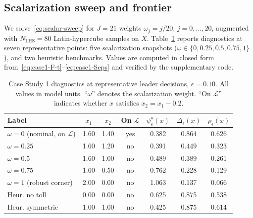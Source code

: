 \documentclass[11pt]{article}
\theoremstyle{definition}
\newcommand{\eps}{\epsilon}
\begin{document}
\subsection{Scalarization sweep and frontier}
We solve~\eqref{eq:scalar-sweep} for $J=21$ weights
$\omega_j=j/20$, $j=0,\dots,20$, augmented with
$N_\mathrm{LHS}=80$ Latin-hypercube samples on $X$.
Table~\ref{tab:case1-diag} reports diagnostics at seven
representative points: five scalarization snapshots
($\omega\in\{0,0.25,0.5,0.75,1\}$), and two heuristic
benchmarks. Values are computed in closed form
from~\eqref{eq:case1-F-t}--\eqref{eq:case1-Seps} and verified by
the supplementary code.

\begin{table}[ht]
\centering
\caption{Case Study 1 diagnostics at representative leader
decisions, $\eps=0.10$. All values in model units. ``$\omega$''
denotes the scalarization weight. ``On $\mathcal L$'' indicates
whether $x$ satisfies $x_2=x_1-0.2$.}
\label{tab:case1-diag}
\small
\begin{tabular}{@{}lcccccc@{}}
\toprule
Label & $x_1$ & $x_2$ & On $\mathcal L$ &
$\psi_\eps^o(x)$ & $\Delta_\eps(x)$ & $\rho_\eps(x)$\\
\midrule
$\omega=0$ (nominal, on $\mathcal L$) & 1.60 & 1.40 & yes & 0.382 & 0.864 & 0.626\\
$\omega=0.25$                         & 1.60 & 1.20 & no  & 0.391 & 0.449 & 0.323\\
$\omega=0.5$                          & 1.60 & 1.00 & no  & 0.489 & 0.389 & 0.261\\
$\omega=0.75$                         & 1.60 & 0.50 & no  & 0.762 & 0.228 & 0.129\\
$\omega=1$ (robust corner)            & 2.00 & 0.00 & no  & 1.063 & 0.137 & 0.066\\
Heur. no toll                         & 0.00 & 0.00 & no  & 0.625 & 0.875 & 0.538\\
Heur. symmetric                       & 1.00 & 1.00 & no  & 0.425 & 0.875 & 0.614\\
\bottomrule
\end{tabular}
\end{table}
\end{document}
